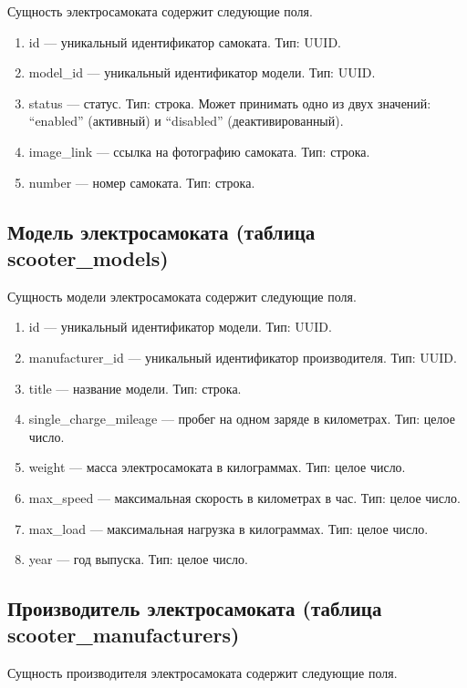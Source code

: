 Сущность электросамоката содержит следующие поля.

\begin{enumerate}
	\item id --- уникальный идентификатор самоката. Тип: UUID.
	\item model\_id --- уникальный идентификатор модели. Тип: UUID.
	\item status --- статус. Тип: строка. Может принимать одно из двух значений:
	      \enquote{enabled} (активный) и \enquote{disabled} (деактивированный).
	\item image\_link --- ссылка на фотографию самоката. Тип: строка.
	\item number --- номер самоката. Тип: строка.
\end{enumerate}

\subsection{Модель электросамоката (таблица scooter\_models)}

Сущность модели электросамоката содержит следующие поля.

\begin{enumerate}
	\item id --- уникальный идентификатор модели. Тип: UUID.
	\item manufacturer\_id --- уникальный идентификатор производителя. Тип: UUID.
	\item title --- название модели. Тип: строка.
	\item single\_charge\_mileage --- пробег на одном заряде в километрах. Тип: целое
	      число.
	\item weight --- масса электросамоката в килограммах. Тип: целое число.
	\item max\_speed --- максимальная скорость в километрах в час. Тип: целое число.
	\item max\_load --- максимальная нагрузка в килограммах. Тип: целое число.
	\item year --- год выпуска. Тип: целое число.
\end{enumerate}

\subsection{Производитель электросамоката (таблица scooter\_manufacturers)}

Сущность производителя электросамоката содержит следующие поля.

